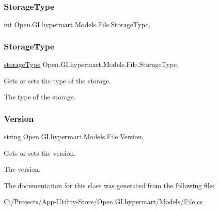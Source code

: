 \subsubsection{\texorpdfstring{Storage\+Type}{StorageType}\hspace{0.1cm}{\footnotesize\ttfamily [1/2]}}
{\footnotesize\ttfamily int Open.\+G\+I.\+hypermart.\+Models.\+File.\+Storage\+Type\hspace{0.3cm}{\ttfamily [get]}, {\ttfamily [set]}}

\hypertarget{class_open_1_1_g_i_1_1hypermart_1_1_models_1_1_file_a4d6910e1f3277beb5b50309e8139a356}{}\label{class_open_1_1_g_i_1_1hypermart_1_1_models_1_1_file_a4d6910e1f3277beb5b50309e8139a356} 
\subsubsection{\texorpdfstring{Storage\+Type}{StorageType}\hspace{0.1cm}{\footnotesize\ttfamily [2/2]}}
{\footnotesize\ttfamily \hyperlink{namespace_open_1_1_g_i_1_1hypermart_1_1_models_a21c5ffa7da75ad8a6d2b04798113f9db}{storage\+Type} Open.\+G\+I.\+hypermart.\+Models.\+File.\+Storage\+Type\hspace{0.3cm}{\ttfamily [get]}, {\ttfamily [set]}}



Gets or sets the type of the storage. 

The type of the storage. \hypertarget{class_open_1_1_g_i_1_1hypermart_1_1_models_1_1_file_a59b1cbe55394fce55d55200ea7e55cae}{}\label{class_open_1_1_g_i_1_1hypermart_1_1_models_1_1_file_a59b1cbe55394fce55d55200ea7e55cae} 
\subsubsection{\texorpdfstring{Version}{Version}}
{\footnotesize\ttfamily string Open.\+G\+I.\+hypermart.\+Models.\+File.\+Version\hspace{0.3cm}{\ttfamily [get]}, {\ttfamily [set]}}



Gets or sets the version. 

The version. 

The documentation for this class was generated from the following file\+:\begin{DoxyCompactItemize}
\item 
C\+:/\+Projects/\+App-\/\+Utility-\/\+Store/\+Open.\+G\+I.\+hypermart/\+Models/\hyperlink{_models_2_file_8cs}{File.\+cs}\end{DoxyCompactItemize}
